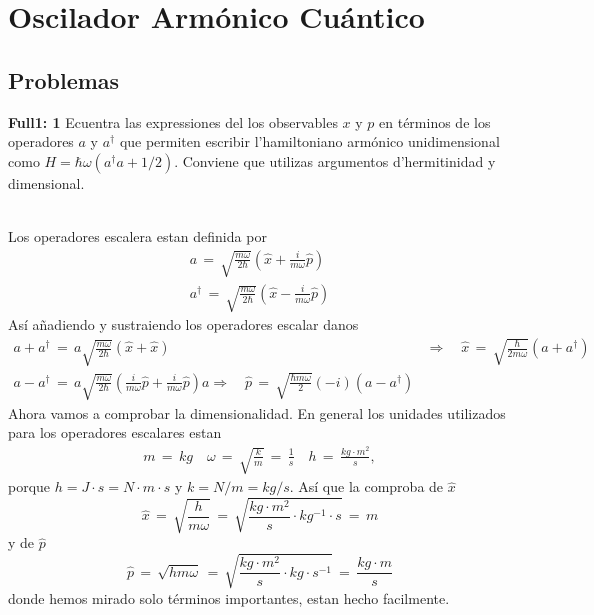 \chapter{Oscilador Armónico Cuántico}

\section{Problemas}

\begin{ejercicio}
\textbf{Full1: 1}
Ecuentra las expressiones del los observables $x$ y $p$ en términos de los
operadores $a$ y $a^\dagger$ que permiten escribir l'hamiltoniano armónico
unidimensional como $H = \hbar \omega (a^\dagger a + 1/2)$. Conviene que
utilizas argumentos d'hermitinidad y dimensional.	\\\\
\end{ejercicio}
\begin{solucion}
Los operadores escalera estan definida por
\begin{align*}
	a \,=\, \sqrt{\frac{m\omega}{2 \hbar}} \left( \hat x + \frac{i}{m \omega} \hat p
\right)	\\
	a^\dagger \,=\, \sqrt{\frac{m\omega}{2 \hbar}} \left( \hat x - \frac{i}{m \omega}
\hat p\right)
\end{align*}
Así añadiendo y sustraiendo los operadores escalar danos
\begin{align*}
	a + a^\dagger \,=\,a \sqrt{\frac{m \omega}{2 \hbar}} ( \hat x + \hat x) &
\Rightarrow \quad \hat x \,=\, \sqrt{\frac{\hbar }{2 m \omega}} (a + a^\dagger) \\
	a - a^\dagger \,=\,a \sqrt{\frac{m \omega}{2 \hbar}} \left(\frac{i}{m
\omega} \hat p + \frac{i}{m \omega} \hat p \right) a \Rightarrow \quad \hat p
\,=\, \sqrt{\frac{\hbar m \omega}{2}} (-i) (a - a^\dagger)
\end{align*}
Ahora vamos a comprobar la dimensionalidad. En general los unidades utilizados
para los operadores escalares estan
\begin{align*}
	m \,=\, kg \quad \omega \,=\, \sqrt{\frac{k}{m}} \,=\, \frac{1}{s} \quad h
\,=\, \frac{kg \cdot m^2}{s},
\end{align*}
porque $h = J\cdot s = N \cdot m \cdot s$ y $k = N / m = kg / s$. Así que la
comproba de $\hat x$
\begin{equation*}
	\hat x \,=\, \sqrt{\frac{h}{m \omega}} \,=\, \sqrt{\frac{kg \cdot m^2}{s} 
\cdot kg^{-1} \cdot s} \,=\, m
\end{equation*}
y de $\hat p$
\begin{equation*}
	\hat p \,=\, \sqrt{h m \omega} \,=\, \sqrt{\frac{kg \cdot m^2}{s} \cdot kg
\cdot s^{-1}} \,=\, \frac{kg \cdot m}{s}
\end{equation*}
donde hemos mirado solo términos importantes, estan hecho facilmente.

\end{solucion}


